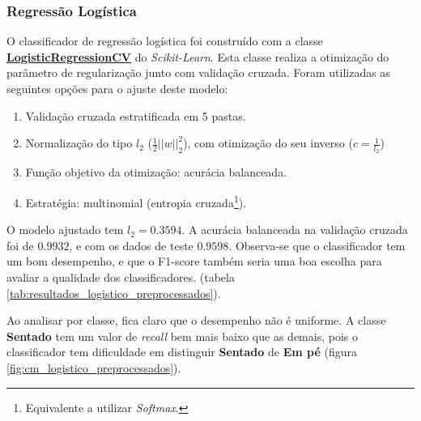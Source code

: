 \documentclass[final,5p]{elsarticle}
\numberwithin{equation}{section}
\begin{document}
    \subsubsection{Regressão Logística} \label{sec:logistica}

        O classificador de regressão logística foi construído com a classe \href{https://scikit-learn.org/stable/modules/generated/sklearn.linear_model.LogisticRegressionCV.html}{\textbf{LogisticRegressionCV}} do \emph{Scikit-Learn}. Esta classe realiza a otimização do parâmetro de regularização junto com validação cruzada. Foram utilizadas as seguintes opções para o ajuste deste modelo:

        \begin{enumerate}
            \item Validação cruzada estratificada em 5 pastas.
            \item Normalização do tipo $l_2$ ($\frac{1}{2} ||w||_2^2$), com otimização do seu inverso ($c = \frac{1}{l_2}$)
            \item Função objetivo da otimização: acurácia balanceada.
            \item Estratégia: multinomial (entropia cruzada\footnote{Equivalente a utilizar \emph{Softmax}.}).
        \end{enumerate}

        O modelo ajustado tem $l_2 = 0.3594$. A acurácia balanceada na validação cruzada foi de $0.9932$, e com os dados de teste $0.9598$. Observa-se que o classificador tem um bom desempenho, e que o F1-score também seria uma boa escolha para avaliar a qualidade dos classificadores. (tabela \ref{tab:resultados_logistico_preprocessados}).

        Ao analisar por classe, fica claro que o desempenho não é uniforme. A classe \textbf{Sentado} tem um valor de \emph{recall} bem mais baixo que as demais, pois o classificador tem dificuldade em distinguir \textbf{Sentado} de \textbf{Em pé} (figura \ref{fig:cm_logistico_preprocessados}).
\end{document}
